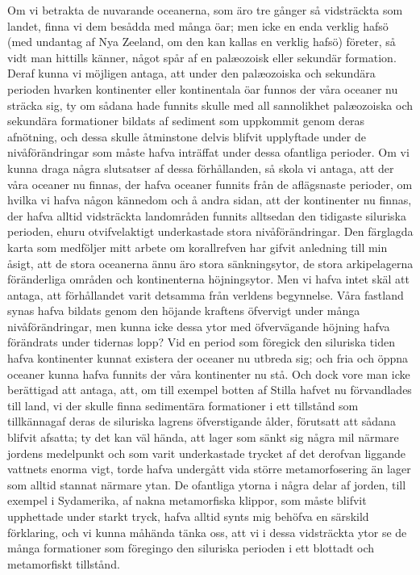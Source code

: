 Om vi betrakta de nuvarande oceanerna, som äro tre gånger så vidsträckta som landet, finna vi dem besådda med många öar; men icke en enda verklig hafsö (med undantag af Nya Zeeland, om den kan kallas en verklig hafsö) företer, så vidt man hittills känner, något spår af en palæozoisk eller sekundär formation. Deraf kunna vi möjligen antaga, att under den palæozoiska och sekundära perioden hvarken kontinenter eller kontinentala öar funnos der våra oceaner nu sträcka sig, ty om sådana hade funnits skulle med all sannolikhet palæozoiska och sekundära formationer bildats af sediment som uppkommit genom deras afnötning, och dessa skulle åtminstone delvis blifvit upplyftade under de nivåförändringar som måste hafva inträffat under dessa ofantliga perioder. Om vi kunna draga några slutsatser af dessa förhållanden, så skola vi antaga, att der våra oceaner nu finnas, der hafva oceaner funnits från de aflägsnaste perioder, om hvilka vi hafva någon kännedom och å andra sidan, att der kontinenter nu finnas, der hafva alltid vidsträckta landområden funnits alltsedan den tidigaste siluriska perioden, ehuru otvifvelaktigt underkastade stora nivåförändringar. Den färglagda karta som medföljer mitt arbete om korallrefven har gifvit anledning till min åsigt, att de stora oceanerna ännu äro stora sänkningsytor, de stora arkipelagerna föränderliga områden och kontinenterna höjningsytor. Men vi hafva intet skäl att antaga, att förhållandet varit detsamma från verldens begynnelse. Våra fastland synas hafva bildats genom den höjande kraftens öfvervigt under många nivåförändringar, men kunna icke dessa ytor med öfvervägande höjning hafva förändrats under tidernas lopp? Vid en period som föregick den siluriska tiden hafva kontinenter kunnat existera der oceaner nu utbreda sig; och fria och öppna oceaner kunna hafva funnits der våra kontinenter nu stå. Och dock vore man icke berättigad att antaga, att, om till exempel botten af Stilla hafvet nu förvandlades till land, vi der skulle finna sedimentära formationer i ett tillstånd som tillkännagaf deras de siluriska lagrens öfverstigande ålder, förutsatt att sådana blifvit afsatta; ty det kan väl hända, att lager som sänkt sig några mil närmare jordens medelpunkt och som varit underkastade trycket af det derofvan liggande vattnets enorma vigt, torde hafva undergått vida större metamorfosering än lager som alltid stannat närmare ytan. De ofantliga ytorna i några delar af jorden, till exempel i Sydamerika, af nakna metamorfiska klippor, som måste blifvit upphettade under starkt tryck, hafva alltid synts mig behöfva en särskild förklaring, och vi kunna måhända tänka oss, att vi i dessa vidsträckta ytor se de många formationer som föregingo den siluriska perioden i ett blottadt och metamorfiskt tillstånd.


